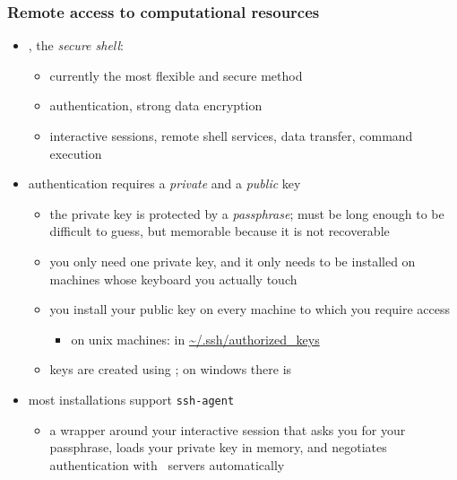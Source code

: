 \begin{frame}[fragile]
%
  \frametitle{Remote access to computational resources}
%
  \begin{itemize}
%
  \item \ssh, the {\em secure shell}:
    \begin{itemize}
    \item currently the most flexible and secure method
    \item authentication, strong data encryption
    \item interactive sessions, remote shell services, data transfer, command execution
    \end{itemize}
%
  \item authentication requires a {\em private} and a {\em public} key
    \begin{itemize}
    \item the private key is protected by a {\em passphrase}; must be long enough to be
      difficult to guess, but memorable because it is not recoverable
    \item you only need one private key, and it only needs to be installed on machines whose
      keyboard you actually touch
    \item you install your public key on every machine to which you require access
      \begin{itemize}
        \item on unix machines: in \url{~/.ssh/authorized_keys}
      \end{itemize}
    \item keys are created using \sshkeygen; on windows there is \putty
    \end{itemize}
%
  \item most installations support {\tt\small ssh-agent}
    \begin{itemize}
    \item a wrapper around your interactive session that asks you for your passphrase, loads
      your private key in memory, and negotiates authentication with \ssh\ servers
      automatically
    \end{itemize}
%
  \end{itemize}
%
\end{frame}

